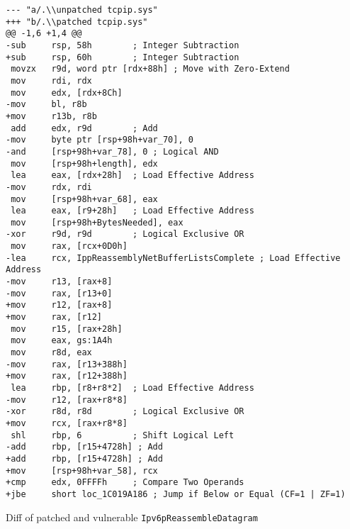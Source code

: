 \documentclass{report}
\begin{document}
\begin{listing}[H]
    \begin{verbatim}
--- "a/.\\unpatched tcpip.sys"
+++ "b/.\\patched tcpip.sys"
@@ -1,6 +1,4 @@
-sub     rsp, 58h        ; Integer Subtraction
+sub     rsp, 60h        ; Integer Subtraction
 movzx   r9d, word ptr [rdx+88h] ; Move with Zero-Extend
 mov     rdi, rdx
 mov     edx, [rdx+8Ch]
-mov     bl, r8b
+mov     r13b, r8b
 add     edx, r9d        ; Add
-mov     byte ptr [rsp+98h+var_70], 0
-and     [rsp+98h+var_78], 0 ; Logical AND
 mov     [rsp+98h+length], edx
 lea     eax, [rdx+28h]  ; Load Effective Address
-mov     rdx, rdi
 mov     [rsp+98h+var_68], eax
 lea     eax, [r9+28h]   ; Load Effective Address
 mov     [rsp+98h+BytesNeeded], eax
-xor     r9d, r9d        ; Logical Exclusive OR
 mov     rax, [rcx+0D0h]
-lea     rcx, IppReassemblyNetBufferListsComplete ; Load Effective Address
-mov     r13, [rax+8]
-mov     rax, [r13+0]
+mov     r12, [rax+8]
+mov     rax, [r12]
 mov     r15, [rax+28h]
 mov     eax, gs:1A4h
 mov     r8d, eax
-mov     rax, [r13+388h]
+mov     rax, [r12+388h]
 lea     rbp, [r8+r8*2]  ; Load Effective Address
-mov     r12, [rax+r8*8]
-xor     r8d, r8d        ; Logical Exclusive OR
+mov     rcx, [rax+r8*8]
 shl     rbp, 6          ; Shift Logical Left
-add     rbp, [r15+4728h] ; Add
+add     rbp, [r15+4728h] ; Add
+mov     [rsp+98h+var_58], rcx
+cmp     edx, 0FFFFh     ; Compare Two Operands
+jbe     short loc_1C019A186 ; Jump if Below or Equal (CF=1 | ZF=1)
\end{verbatim}
\caption{Diff of patched and vulnerable \texttt{Ipv6pReassembleDatagram}}
\label{listing:diff:Ipv6pReassembleDatagram}
\end{listing}
\end{document}

